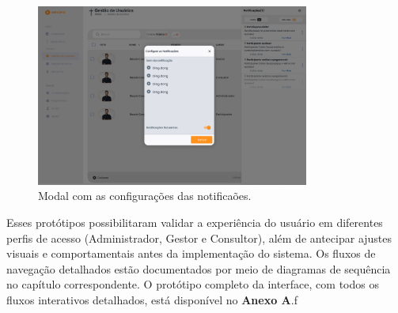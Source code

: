 \begin{figure}[H]
\centering
\includegraphics[width=0.8\textwidth]{images/prototipacao/notificacoes/notificacoesmodal.png}
\caption{Modal com as configurações das notificaões.}
\end{figure}


Esses protótipos possibilitaram validar a experiência do usuário em diferentes perfis de acesso (Administrador, Gestor e Consultor), além de antecipar ajustes visuais e comportamentais antes da implementação do sistema. Os fluxos de navegação detalhados estão documentados por meio de diagramas de sequência no capítulo correspondente.
O protótipo completo da interface, com todos os fluxos interativos detalhados, está disponível no \textbf{Anexo A}.f